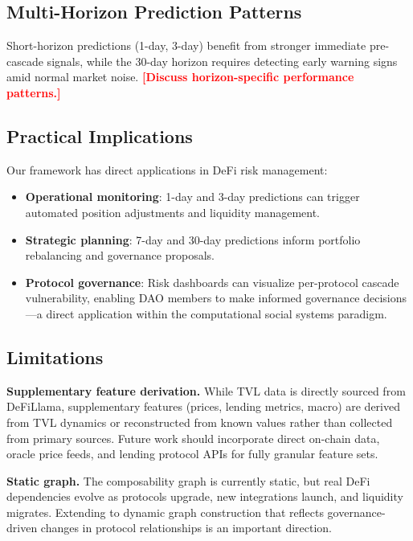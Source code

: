 \documentclass[journal]{IEEEtran}
\newcommand{\TODO}[1]{\textcolor{red}{\textbf{[#1]}}}
\begin{document}
\subsection{Multi-Horizon Prediction Patterns}

Short-horizon predictions (1-day, 3-day) benefit from stronger immediate pre-cascade signals, while the 30-day horizon requires detecting early warning signs amid normal market noise.
\TODO{Discuss horizon-specific performance patterns.}

\subsection{Practical Implications}

Our framework has direct applications in DeFi risk management:
\begin{itemize}
    \item \textbf{Operational monitoring}: 1-day and 3-day predictions can trigger automated position adjustments and liquidity management.
    \item \textbf{Strategic planning}: 7-day and 30-day predictions inform portfolio rebalancing and governance proposals.
    \item \textbf{Protocol governance}: Risk dashboards can visualize per-protocol cascade vulnerability, enabling DAO members to make informed governance decisions---a direct application within the computational social systems paradigm.
\end{itemize}

\subsection{Limitations}

\textbf{Supplementary feature derivation.} While TVL data is directly sourced from DeFiLlama, supplementary features (prices, lending metrics, macro) are derived from TVL dynamics or reconstructed from known values rather than collected from primary sources. Future work should incorporate direct on-chain data, oracle price feeds, and lending protocol APIs for fully granular feature sets.

\textbf{Static graph.} The composability graph is currently static, but real DeFi dependencies evolve as protocols upgrade, new integrations launch, and liquidity migrates. Extending to dynamic graph construction that reflects governance-driven changes in protocol relationships is an important direction.
\end{document}
